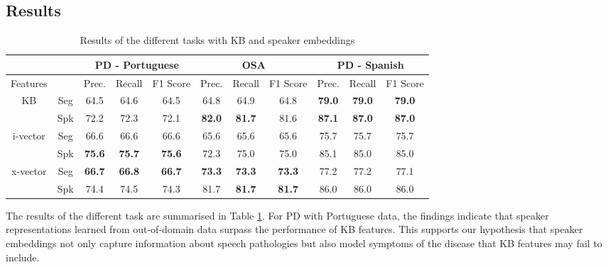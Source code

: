 \subsection{Results}
\begin{table}[h]
  \begin{tabular}{cc|ccc|ccc|ccc} \hline
                            &     & \multicolumn{3}{c|}{PD - Portuguese} & \multicolumn{3}{c|}{OSA}                      & \multicolumn{3}{c}{PD - Spanish} \\ \hline
  Features                  &     & Prec.        & Recall           & F1 Score        & Prec.     & Recall        & F1 Score      & Prec.       & Recall         & F1 Score       \\ \hline
  \multirow{2}{*}{KB}       & Seg & 64.5             & 64.6             & 64.5            & 64.8          & 64.9          & 64.8          & \textbf{79.0}   & \textbf{79.0}  & \textbf{79.0}  \\
                            & Spk & 72.2             & 72.3             & 72.1            & \textbf{82.0} & \textbf{81.7} & 81.6          & \textbf{87.1}   & \textbf{87.0}  & \textbf{87.0}  \\ \hline
  \multirow{2}{*}{i-vector} & Seg & 66.6             & 66.6             & 66.6            & 65.6          & 65.6          & 65.6          & 75.7            & 75.7           & 75.7           \\
                            & Spk & \textbf{75.6}    & \textbf{75.7}    & \textbf{75.6}   & 72.3          & 75.0          & 75.0          & 85.1            & 85.0           & 85.0           \\ \hline
  \multirow{2}{*}{x-vector} & Seg & \textbf{66.7}    & \textbf{66.8}    & \textbf{66.7}   & \textbf{73.3} & \textbf{73.3} & \textbf{73.3} & 77.2            & 77.2           & 77.1           \\
                            & Spk & 74.4             & 74.5             & 74.3            & 81.7          & \textbf{81.7} & \textbf{81.7} & 86.0            & 86.0           & 86.0 \\ \hline    
  \end{tabular}
  \caption{Results of the different tasks with KB and speaker embeddings}
  \label{tab:xvect_results}
  \end{table}
The results of the different task are summarised in Table \ref{tab:xvect_results}. For \ac{PD} with Portuguese data, the findings indicate that speaker representations learned from out-of-domain data surpass the performance of \ac{KB} features. This supports our hypothesis that speaker embeddings not only capture information about speech pathologies but also model symptoms of the disease that \ac{KB} features may fail to include.


